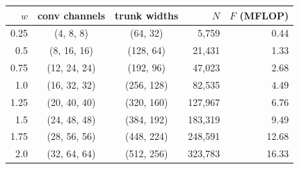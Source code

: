 \begin{tabular}{@{}r c c r r@{}}
\toprule
$w$ & conv channels & trunk widths & $N$ & $F$ (MFLOP) \\
\midrule
0.25 & (4, 8, 8) & (64, 32) & 5,759 & 0.44 \\
0.5 & (8, 16, 16) & (128, 64) & 21,431 & 1.33 \\
0.75 & (12, 24, 24) & (192, 96) & 47,023 & 2.68 \\
1.0 & (16, 32, 32) & (256, 128) & 82,535 & 4.49 \\
1.25 & (20, 40, 40) & (320, 160) & 127,967 & 6.76 \\
1.5 & (24, 48, 48) & (384, 192) & 183,319 & 9.49 \\
1.75 & (28, 56, 56) & (448, 224) & 248,591 & 12.68 \\
2.0 & (32, 64, 64) & (512, 256) & 323,783 & 16.33 \\
\bottomrule
\end{tabular}

